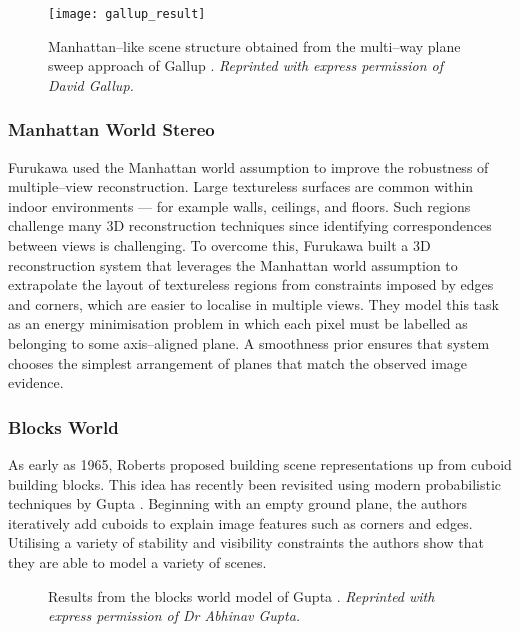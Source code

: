 \begin{figure}[tb]
  \centering
  \texttt{[image: gallup\_result]}
  \caption{Manhattan--like scene structure obtained from the
    multi--way plane sweep approach of Gallup
    \etal \cite{Gallup2007}.
    \textit{Reprinted with express permission of David Gallup.}
  }
  \label{fig:gallup-result}
\end{figure}

\subsubsection{Manhattan World Stereo}

Furukawa \etal \cite{Furukawa09} used the Manhattan world assumption
to improve the robustness of multiple--view reconstruction. Large
textureless surfaces are common within indoor environments --- for
example walls, ceilings, and floors. Such regions challenge many 3D
reconstruction techniques since identifying correspondences
between views is challenging. To overcome this, Furukawa \etal built a
3D reconstruction system that leverages the Manhattan world assumption
to extrapolate the layout of textureless regions from constraints
imposed by edges and corners, which are easier to localise in multiple
views. They model this task as an energy minimisation problem in which
each pixel must be labelled as belonging to some axis--aligned
plane. A smoothness prior ensures that system chooses the simplest
arrangement of planes that match the observed image evidence.

\subsubsection{Blocks World}

As early as 1965, Roberts \cite{Roberts65} proposed building scene
representations up from cuboid building blocks. This idea has recently
been revisited using modern probabilistic techniques by Gupta \etal
\cite{Gupta10}. Beginning with an empty ground plane, the authors
iteratively add cuboids to explain image features such as corners and
edges. Utilising a variety of stability and visibility constraints
the authors show that they are able to model a variety of scenes.

\begin{figure}[tb]
  \centering
  \caption{Results from the blocks world model of Gupta \etal
    \cite{Gupta10}.
    \textit{Reprinted with express permission of Dr Abhinav Gupta.}
  }
  \label{fig:gupta-result}
\end{figure}

